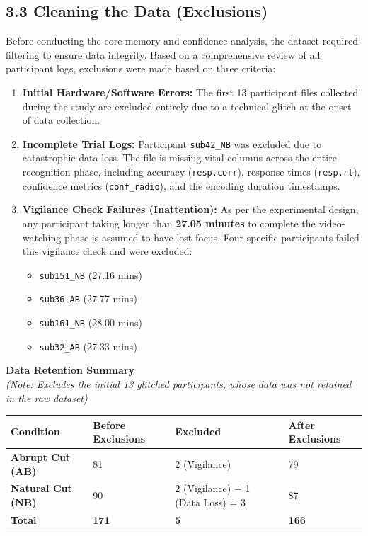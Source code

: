 \documentclass[10pt,a4paper]{article}
\begin{document}
\subsection{3.3 Cleaning the Data (Exclusions)}
Before conducting the core memory and confidence analysis, the dataset required filtering to ensure data integrity. Based on a comprehensive review of all participant logs, exclusions were made based on three criteria:

\begin{enumerate}
    \item \textbf{Initial Hardware/Software Errors:} The first 13 participant files collected during the study are excluded entirely due to a technical glitch at the onset of data collection.
    \item \textbf{Incomplete Trial Logs:} Participant \texttt{sub42\_NB} was excluded due to catastrophic data loss. The file is missing vital columns across the entire recognition phase, including accuracy (\texttt{resp.corr}), response times (\texttt{resp.rt}), confidence metrics (\texttt{conf\_radio}), and the encoding duration timestamps.
    \item \textbf{Vigilance Check Failures (Inattention):} As per the experimental design, any participant taking longer than \textbf{27.05 minutes} to complete the video-watching phase is assumed to have lost focus. Four specific participants failed this vigilance check and were excluded:
    \begin{itemize}
        \item \texttt{sub151\_NB} (27.16 mins)
        \item \texttt{sub36\_AB} (27.77 mins)
        \item \texttt{sub161\_NB} (28.00 mins)
        \item \texttt{sub32\_AB} (27.33 mins)
    \end{itemize}
\end{enumerate}

\textbf{Data Retention Summary} \\
\textit{(Note: Excludes the initial 13 glitched participants, whose data was not retained in the raw dataset)}

\begin{table}[H]
\centering\small
\begin{tabular}{l l l l}
\toprule
Condition & Before Exclusions & Excluded & After Exclusions \\
\midrule
\textbf{Abrupt Cut (AB)} & 81 & 2 (Vigilance) & 79 \\
\textbf{Natural Cut (NB)} & 90 & 2 (Vigilance) + 1 (Data Loss) = 3 & 87 \\
\midrule
\textbf{Total} & \textbf{171} & \textbf{5} & \textbf{166} \\
\bottomrule
\end{tabular}
\end{table}
\end{document}
